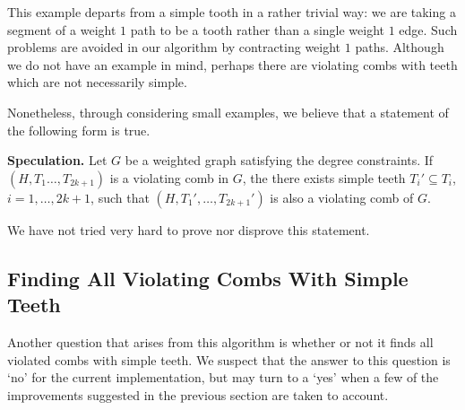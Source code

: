 \documentclass[12pt, letterpaper]{amsart}
\theoremstyle{plain}
\theoremstyle{definition}
\theoremstyle{remark}
\begin{document}
This example departs from a simple tooth in a rather trivial way: we are taking
a segment of a weight $1$ path to be a tooth rather than a single weight $1$
edge. Such problems are avoided in our algorithm by contracting weight $1$
paths. Although we do not have an example in mind, perhaps there are violating
combs with teeth which are not necessarily simple.

Nonetheless, through considering small examples, we believe that a statement of
the following form is true.

\noindent\textbf{Speculation.} Let $G$ be a weighted graph satisfying
the degree constraints. If $(H,T_1\ldots,T_{2k+1})$ is a violating comb in $G$,
the there exists simple teeth $T_i' \subseteq T_i$, $i = 1,\ldots,2k+1$, such
that $(H,T_1',\ldots,T_{2k+1}')$ is also a violating comb of $G$.

We have not tried very hard to prove nor disprove this statement.

\subsection{Finding All Violating Combs With Simple Teeth}
Another question that arises from this algorithm is whether or not it finds all
violated combs with simple teeth. We suspect that the answer to this question
is `no' for the current implementation, but may turn to a `yes' when a few of
the improvements suggested in the previous section are taken to account.
\end{document}
